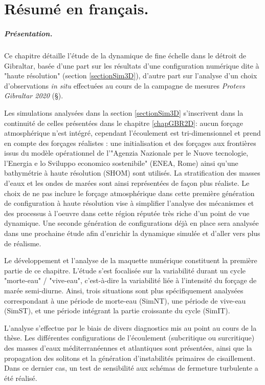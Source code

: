 
\section{Résumé en français.}

\subparagraph{Présentation.}
Ce chapitre détaille l'étude de la dynamique de fine échelle dans le détroit de Gibraltar, basée d'une part sur les résultats d'une configuration numérique dite à "haute résolution" (section \ref{sectionSim3D}), d'autre part sur l'analyse d'un choix d'observations \textit{in situ} effectuées au cours de la campagne de mesures \textit{Protevs Gibraltar 2020} (\S  {}).

Les simulations analysées dans la section \ref{sectionSim3D} s'inscrivent dans la continuité de celles présentées dans le chapitre \ref{chapGBR2D}: aucun forçage atmosphérique n'est intégré, cependant l'écoulement est tri-dimensionnel et prend en compte des forçages réalistes : une initialisation et des forçages aux frontières issus du modèle opérationnel de l'"Agenzia Nazionale per le Nuove tecnologie, l'Energia e lo Sviluppo economico sostenibile" (ENEA, Rome) ainsi qu'une bathymétrie à haute résolution (SHOM) sont  utilisés. La stratification des masses d'eaux et les ondes de marées sont ainsi représentées de façon plus réaliste. Le choix de ne pas inclure le forçage atmosphérique dans cette première génération de configuration à haute résolution vise à simplifier l'analyse des mécanismes et des processus à l'oeuvre dans cette région réputée très riche d'un point de vue dynamique. Une seconde génération de configurations déjà en place sera analysée dans une prochaine étude afin d'enrichir la dynamique simulée et d'aller  vers plus de réalisme. 

Le développement et l'analyse de la maquette numérique constituent la première partie de ce chapitre. L'étude s'est focalisée sur la variabilité durant un cycle "morte-eau" / "vive-eau", c'est-à-dire la variabilité liée à l'intensité du forçage de marée semi-diurne. Ainsi, trois situations sont plus spécifiquement analysées correspondant à une période de morte-eau (SimNT), une période de vive-eau (SimST), et une période intégrant la partie croissante du cycle (SimIT).

L'analyse s'effectue par le biais de divers diagnostics mis au point au cours de la thèse. Les différentes configurations de l'écoulement (subcritique ou surcritique) des masses d'eaux méditerranéennes et atlantiques sont présentées, ainsi que la propagation des solitons et la génération d'instabilités primaires de cisaillement. Dans ce dernier cas, un test de sensibilité aux schémas de fermeture turbulente a été réalisé.

